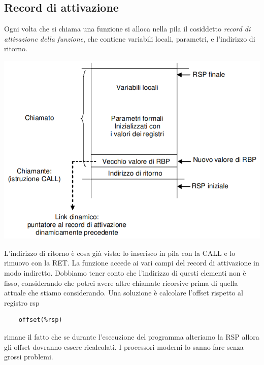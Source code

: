 \subsection{Record di attivazione}
Ogni volta che si chiama una funzione si alloca nella pila il cosiddetto \emph{record di attivazione della funzione}, che contiene variabili locali, parametri, e l'indirizzo di ritorno.
\begin{center}
	\includegraphics[scale=0.59]{img/20.PNG}
\end{center} 
L'indirizzo di ritorno è cosa già vista: lo inserisco in pila con la CALL e lo rimuovo con la RET. La funzione accede ai vari campi del record di attivazione in modo indiretto. Dobbiamo tener conto che l'indirizzo di questi elementi non è fisso, considerando che potrei avere altre chiamate ricorsive prima di quella attuale che stiamo considerando. Una soluzione è calcolare l'offset rispetto al registro rsp
\begin{verbatim}
	offset(%rsp)
\end{verbatim}
rimane il fatto che se durante l'esecuzione del programma alteriamo la RSP allora gli offset dovranno essere ricalcolati. I processori moderni lo sanno fare senza grossi problemi.
